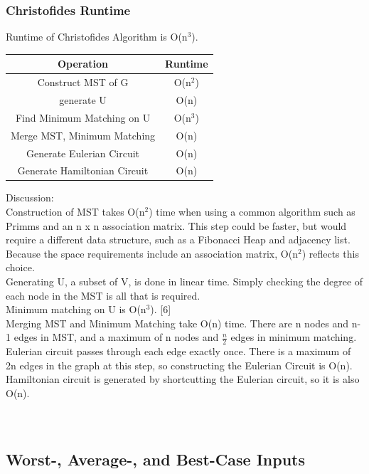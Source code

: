 \documentclass[12pt, oneside]{article}   	%
\begin{document}
\subsubsection {Christofides Runtime}
\indent\indent\indent Runtime of Christofides Algorithm is O(n$^3$).\\
\begin{center}
\begin{tabular}{|c|c|}
\hline
Operation & Runtime\\
\hline
Construct MST of G & O(n$^2$)\\
\hline
generate U & O(n)\\
\hline
Find Minimum Matching on U & O(n$^3$)\\
\hline
Merge MST, Minimum Matching & O(n)\\
\hline
Generate Eulerian Circuit & O(n)\\
\hline
Generate Hamiltonian Circuit & O(n)\\
\hline
\end{tabular}
\end{center}
\indent\indent Discussion:\\
\indent\indent Construction of MST takes O(n$^2$) time when using a common algorithm such as Primms and an n x n association matrix.  This step could be faster, but would require a different data structure, such as a Fibonacci Heap and adjacency list.  Because the space requirements include an association matrix, O(n$^2$) reflects this choice.\\
\indent Generating U, a subset of V, is done in linear time.  Simply checking the degree of each node in the MST is all that is required.\\
\indent Minimum matching on U is O(n$^3$). [6]\\
\indent Merging MST and Minimum Matching take O(n) time. There are n nodes and n-1 edges in MST, and a maximum of n nodes and $\frac{n}{2}$ edges in minimum matching.\\
\indent Eulerian circuit passes through each edge exactly once.  There is a maximum of 2n edges in the graph at this step, so constructing the Eulerian Circuit is O(n).\\
\indent Hamiltonian circuit is generated by shortcutting the Eulerian circuit, so it is also O(n).\\\\\\
\subsection{Worst-, Average-, and Best-Case Inputs}
\end{document}
